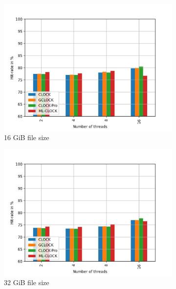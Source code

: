 \documentclass[
	12pt,
	a4paper,
	abstract,
	bibliography=totoc,
	chapterprefix,
	headings=openright,
	numbers=endperiod,
	parskip=half,
	twoside,
]{scrreprt}
\begin{document}
\begin{figure}[H]
	\centering
	\begin{subfigure}{0.4\textwidth}
		\includegraphics[width=\textwidth]{multi_16_gb_rw_50to50_uniform.jpg}		
		\caption{16 GiB file size}
		\label{fig:rw_90to10  zipf}
	\end{subfigure}
	\hfill
	\begin{subfigure}{0.4\textwidth}
		\includegraphics[width=\textwidth]{multi_32_gb_rw_50to50_uniform.jpg}		
		\caption{32 GiB file size}
		\label{fig:rw_90to10  normal}
	\end{subfigure}
	\hfill
	\begin{subfigure}{0.4\textwidth}

\end{subfigure}
\end{figure}
\end{document}
